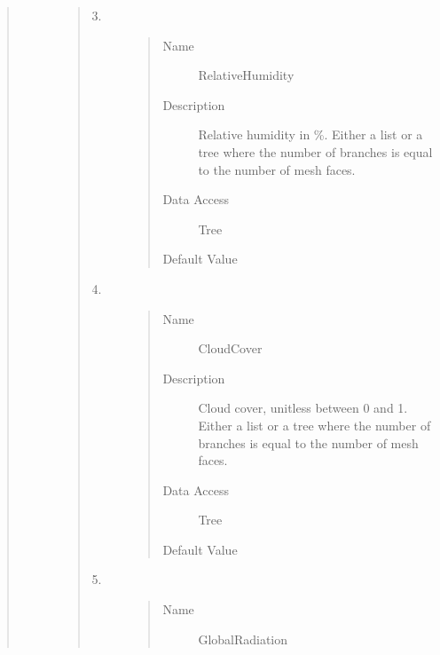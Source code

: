 \documentclass[letterpaper,10pt,english]{sphinxmanual}
\begin{document}
\begin{quote}
\begin{description}
\begin{quote}
\begin{description}
\begin{quote}
\begin{description}
\end{description}\end{quote}

\item[{3.}] \leavevmode\begin{quote}\begin{description}
\item[{Name}] \leavevmode
RelativeHumidity

\item[{Description}] \leavevmode
Relative humidity in \%. Either a list or a tree where the number of branches is equal to the number
of mesh faces.

\item[{Data Access}] \leavevmode
Tree

\item[{Default Value}] \leavevmode
{}

\end{description}\end{quote}

\item[{4.}] \leavevmode\begin{quote}\begin{description}
\item[{Name}] \leavevmode
CloudCover

\item[{Description}] \leavevmode
Cloud cover, unitless between 0 and 1. Either a list or a tree where the number of branches is equal to the number
of mesh faces.

\item[{Data Access}] \leavevmode
Tree

\item[{Default Value}] \leavevmode
{}

\end{description}\end{quote}

\item[{5.}] \leavevmode\begin{quote}\begin{description}
\item[{Name}] \leavevmode
GlobalRadiation


\end{description}
\end{quote}
\end{description}
\end{quote}
\end{description}
\end{quote}
\end{document}
